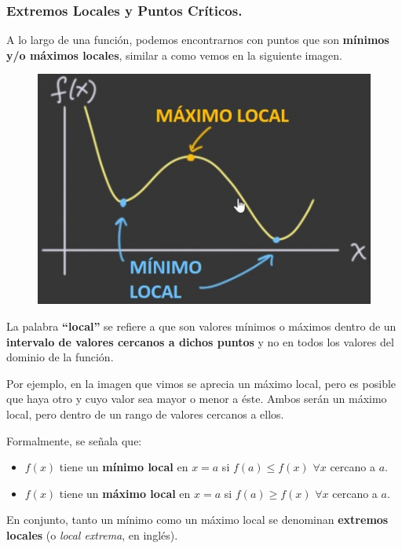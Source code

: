 \documentclass[12pt]{article}
\begin{document}
\subsubsection{Extremos Locales y Puntos Críticos.}

A lo largo de una función, podemos encontrarnos con puntos que son \textbf{mínimos y/o máximos locales}, similar a como vemos en la siguiente imagen.

\begin{figure}[hbt!]
\centering
\includegraphics[scale=0.5]{img/min-max-local.jpg}
\end{figure}

La palabra \textbf{``local''} se refiere a que son valores mínimos o máximos dentro de un \textbf{intervalo de valores cercanos a dichos puntos} y no en todos los valores del dominio de la función.

Por ejemplo, en la imagen que vimos se aprecia un máximo local, pero es posible que haya otro y cuyo valor sea mayor o menor a éste. Ambos serán un máximo local, pero dentro de un rango de valores cercanos a ellos.

Formalmente, se señala que:

\begin{itemize}
\item $f(x)$ tiene un \textbf{mínimo local} en $x = a$ si $f(a) \leq f(x)$ $\forall x$ cercano a $a$.

\item $f(x)$ tiene un \textbf{máximo local} en $x = a$ si $f(a) \geq f(x)$ $\forall x$ cercano a $a$.
\end{itemize}

En conjunto, tanto un mínimo como un máximo local se denominan \textbf{extremos locales} (o \textit{local extrema}, en inglés).
\end{document}
